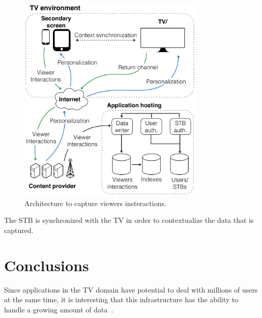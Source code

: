 \documentclass[conference,a4paper]{IEEEtran}
\begin{document}
\begin{figure}[!t]
	\centering
	\includegraphics[width=3.5in]{img/architecture.pdf}
	\caption{Architecture to capture viewers insteractions. }
	\label{fig_architecture}
\end{figure}

The STB is synchronized with the TV in order to contextualize the data that is captured.
\cite{Lee2010}

\section{Conclusions}

Since applications in the TV domain have potential to deal with millions of users at the same time, it is interesting that this infrastructure has the ability to handle a growing amount of data~\cite{Lee2010}.



\end{document}
